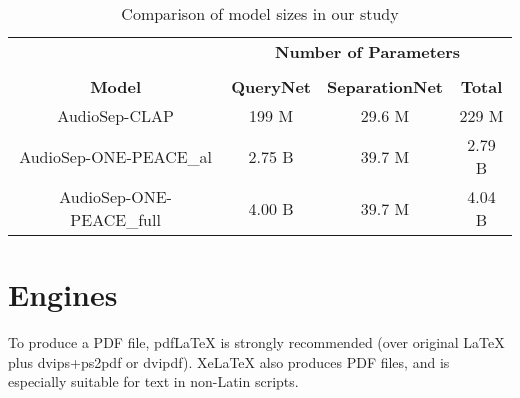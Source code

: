 \documentclass[11pt]{article}
\begin{document}
\begin{table*}
  \centering
  \begin{tabular}{cccc}
                               & \multicolumn{3}{c}{\textbf{Number of Parameters}} \\
    \cline{2-4}
    \vspace{0.25mm} \\  
    \textbf{Model}             & \textbf{QueryNet}  & \textbf{SeparationNet} & \textbf{Total} \\
    \hline
    AudioSep-CLAP              &  199 M             &  29.6 M                & 229 M          \\
    AudioSep-ONE-PEACE\_al     &  2.75 B            &  39.7 M                & 2.79 B         \\
    AudioSep-ONE-PEACE\_full   &  4.00  B           &  39.7 M                & 4.04 B         \\
    \hline
  \end{tabular}
  \caption{Comparison of model sizes in our study}
\end{table*}

\section{Engines}

To produce a PDF file, pdf\LaTeX{} is strongly recommended (over original \LaTeX{} plus dvips+ps2pdf or dvipdf). Xe\LaTeX{} also produces PDF files, and is especially suitable for text in non-Latin scripts.



\end{document}
